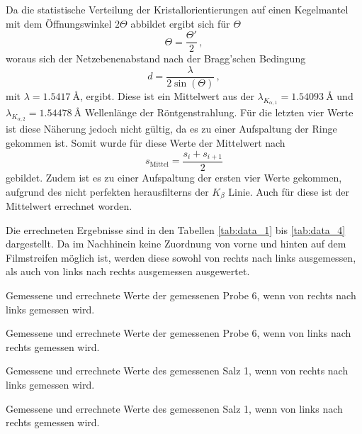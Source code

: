 Da die statistische Verteilung der Kristallorientierungen auf einen Kegelmantel mit dem Öffnungswinkel $2\Theta$ abbildet ergibt sich für $\Theta$
\begin{equation*}
    \Theta = \frac{\Theta'}{2}\,,
\end{equation*}
woraus sich der Netzebenenabstand nach der Bragg'schen Bedingung
\begin{equation*}
    d = \frac{\lambda}{2\sin{(\Theta)}}\,,
\end{equation*}
mit $\lambda = \SI{1.5417}{\angstrom}$, ergibt.
Diese ist ein Mittelwert aus der $\lambda_{K_{\alpha,1}} = \SI{1.54093}{\angstrom}$ und $\lambda_{K_{\alpha,2}} = \SI{1.54478}{\angstrom}$ Wellenlänge der Röntgenstrahlung.
Für die letzten vier Werte ist diese Näherung jedoch nicht gültig, da es zu einer Aufspaltung der Ringe gekommen ist.
Somit wurde für diese Werte der Mittelwert nach
\begin{equation*}
    s_\text{Mittel} = \frac{s_{i} + s_{i+1}}{2}
\end{equation*}
gebildet.
Zudem ist es zu einer Aufspaltung der ersten vier Werte gekommen, aufgrund des nicht perfekten herausfilterns der $K_{\beta}$ Linie.
Auch für diese ist der Mittelwert errechnet worden.

Die errechneten Ergebnisse sind in den Tabellen \ref{tab:data_1} bis \ref{tab:data_4} dargestellt.
Da im Nachhinein keine Zuordnung von vorne und hinten auf dem Filmstreifen möglich ist,
werden diese sowohl von rechts nach links ausgemessen,
als auch von links nach rechts ausgemessen ausgewertet.

\begin{table}[!ht]
    \centering
    \caption{Gemessene und errechnete Werte der gemessenen Probe 6, wenn von rechts nach links gemessen wird.}
    
    \label{tab:data_1}
\end{table}
\begin{table}[!ht]
    \centering
    \caption{Gemessene und errechnete Werte der gemessenen Probe 6, wenn von links nach rechts gemessen wird.}
    
    \label{tab:data_2}
\end{table}
\begin{table}[!ht]
    \centering
    \caption{Gemessene und errechnete Werte des gemessenen Salz 1, wenn von rechts nach links gemessen wird.}
    
    \label{tab:data_3}
\end{table}
\begin{table}[!ht]
    \centering
    \caption{Gemessene und errechnete Werte des gemessenen Salz 1, wenn von links nach rechts gemessen wird.}
    
    \label{tab:data_4}
\end{table}
\clearpage



